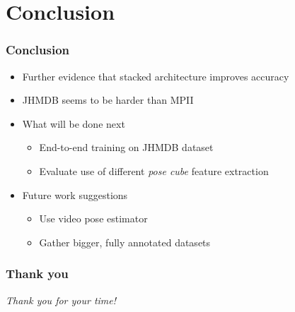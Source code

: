 \documentclass[9pt]{beamer}
\newenvironment{myframe}[1][]{%
\begin{frame}%
\frametitle{#1}
\setcounter{footnote}{0}


}{%
\end{frame}%
}
\begin{document}
\section{Conclusion}
\begin{myframe}[Conclusion]
    \begin{itemize}
        \item Further evidence that stacked architecture improves accuracy
        \item JHMDB seems to be harder than MPII
        \item What will be done next
        \begin{itemize}
            \item End-to-end training on JHMDB dataset
            \item Evaluate use of different \textit{pose cube} feature extraction
        \end{itemize}
        \item Future work suggestions
        \begin{itemize}
            \item Use video pose estimator
            \item Gather bigger, fully annotated datasets
        \end{itemize}
    \end{itemize}
\end{myframe}

\begin{myframe}[Thank you]
    \centering \Large
    \emph{Thank you for your time!}
\end{myframe}
\end{document}
